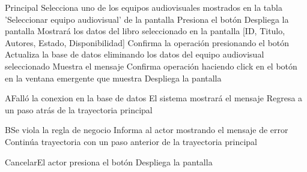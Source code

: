 
\begin{UCtrayectoria}{Principal}
		\UCpaso[\UCactor] Selecciona uno de los equipos audiovisuales mostrados en la tabla 'Seleccionar equipo audiovisual' de la pantalla 
		\UCpaso[\UCactor] Presiona el botón  
		\UCpaso[\UCsist] Despliega la pantalla 
		\UCpaso[\UCsist] Mostrará los datos del libro seleccionado en la pantalla [ID, Titulo, Autores, Estado, Disponibilidad]
		\UCpaso[\UCactor] Confirma la operación presionando el botón  
		\UCpaso[\UCactor] Actualiza la base de datos eliminando los datos del equipo audiovisual seleccionado 
		\UCpaso[\UCsist] Muestra el mensaje 
		\UCpaso[\UCactor] Confirma operación haciendo click en el botón  en la ventana emergente que muestra
		\UCpaso[\UCsist] Despliega la pantalla 
\end{UCtrayectoria}




\begin{UCtrayectoriaA}{A}{Falló la conexion en la base de datos}
			\UCpaso[\UCsist] El sistema mostrará el mensaje 
			\UCpaso[\UCsist] Regresa a un paso atrás de la trayectoria principal 
\end{UCtrayectoriaA}


\begin{UCtrayectoriaA}{B}{Se viola la regla de negocio }	
			\UCpaso[\UCsist] Informa al actor mostrando el mensaje de error 
			\UCpaso[\UCsist] Continúa trayectoria con un paso anterior de la trayectoria principal 
\end{UCtrayectoriaA}


\begin{UCtrayectoriaA}{Cancelar}{El actor presiona el botón }
			\UCpaso[\UCsist] Despliega la pantalla 
\end{UCtrayectoriaA}
